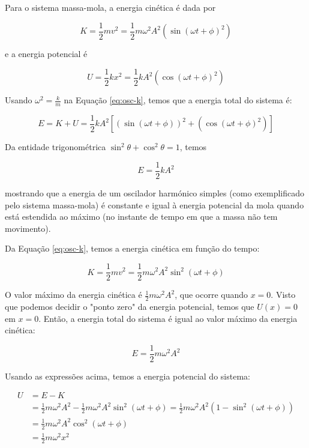 Para o sistema massa-mola, a energia cinética é dada por

\begin{equation}\label{eq:osc-k}
    K=\frac{1}{2}mv^2=\frac{1}{2}m\omega^2A^2(\sin(\omega t + \phi)^2)
\end{equation}

e a energia potencial é

\begin{equation}
    U=\frac{1}{2}kx^2=\frac{1}{2}kA^2(\cos(\omega t +\phi)^2)
\end{equation}

Usando $\omega^2=\frac{k}{m}$ na Equação \ref{eq:osc-k}, temos que a energia total do sistema é:

\begin{equation}
    E=K+U=\frac{1}{2}kA^2[(\sin(\omega t + \phi))^2+(\cos(\omega t + \phi)^2)]
\end{equation}

Da entidade trigonométrica $\sin^2\theta+\cos^2\theta=1$, temos

\begin{equation}
    E=\frac{1}{2}kA^2
\end{equation}

mostrando que a energia de um oscilador harmónico simples (como exemplificado pelo sistema massa-mola) é constante e igual à energia potencial da mola quando está estendida ao máximo (no instante de tempo em que a massa não tem movimento).

Da Equação \ref{eq:osc-k}, temos a energia cinética em função do tempo:

\begin{equation*}
    K=\frac{1}{2}mv^2=\frac{1}{2}m\omega^2A^2\sin^2(\omega t +\phi)
\end{equation*}

O valor máximo da energia cinética é $\frac{1}{2}m\omega^2A^2$, que ocorre quando $x=0$. Visto que podemos decidir o "ponto zero" da energia potencial, temos que $U(x)=0$ em $x=0$. Então, a energia total do sistema é igual ao valor máximo da energia cinética:

\begin{equation*}
    E=\frac{1}{2}m\omega^2A^2
\end{equation*}

Usando as expressões acima, temos a energia potencial do sistema:

$$
\begin{aligned}
    U&=E-K \\
    &=\frac{1}{2}m\omega^2A^2-\frac{1}{2}m\omega^2A^2\sin^2(\omega t +\phi)=\frac{1}{2}m\omega^2A^2(1-\sin^2(\omega t + \phi)) \\
    &=\frac{1}{2}m\omega^2A^2\cos^2(\omega t + \phi) \\
    &=\frac{1}{2}m\omega^2x^2
\end{aligned}
$$

